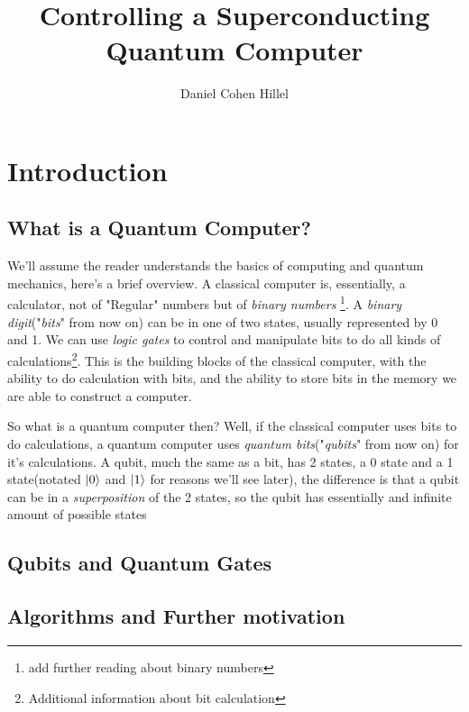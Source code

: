 \documentclass{article}
\title{Controlling a Superconducting Quantum Computer}
\author{Daniel Cohen Hillel}
\date{}
\begin{document}
\maketitle

\newpage

\tableofcontents

\newpage

\section{Introduction}

\subsection{What is a Quantum Computer?}
We'll assume the reader understands the basics of computing and quantum mechanics, here's a brief overview. \newline
 A classical computer is, essentially, a calculator, not of "Regular" numbers but of \textit{binary numbers} \footnote{ add further reading about binary numbers}. A \textit{binary digit}("\textit{bits}" from now on) can be in one of two states, usually represented by 0 and 1. We can use \textit{logic gates} to control and manipulate bits to do all kinds of calculations\footnote{Additional information about bit calculation}. This is the building blocks of the classical computer, with the ability to do calculation with bits, and the ability to store bits in the memory we are able to construct a computer.\newline \par
So what is a quantum computer then? Well, if the classical computer uses bits to do calculations, a quantum computer uses \textit{quantum bits}("\textit{qubits}" from now on) for it's calculations. A qubit, much the same as a bit, has 2 states, a 0 state and a 1 state(notated $\ket{0}$ and $\ket{1}$ for reasons we'll see later), the difference is that a qubit can be in a \textit{superposition} of the 2 states, so the qubit has essentially and infinite amount of possible states

\subsection{Qubits and Quantum Gates}

\subsection{Algorithms and Further motivation}
\end{document}
